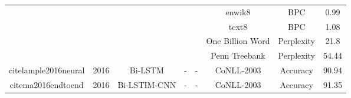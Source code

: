 \documentclass[12pt, a4paper, oneside]{report}
\begin{document}
\begin{tabular}{|c|c|c|c|c|c|cc|}
                                                                          &                       &                                   &                                         &                                                                                                        & enwik8                                & BPC                                                                                                                                & 0.99   \\ \cline{6-8} 
                                                                          &                       &                                   &                                         &                                                                                                        & text8                                 & BPC                                                                                                                                & 1.08   \\ \cline{6-8} 
                                                                          &                       &                                   &                                         &                                                                                                        & One Billion Word                      & Perplexity                                                                                                                         & 21.8   \\ \cline{6-8} 
                                                                          &                       &                                   &                                         &                                                                                                        & Penn Treebank                         & Perplexity                                                                                                                         & 54.44  \\ \hline
    cite{lample2016neural}                              & 2016                  & Bi-LSTM                           & -                                       & -                                                                                                      & CoNLL-2003                            & \multicolumn{1}{c|}{Accuracy}                                                                                                      & 90.94  \\ \hline
    cite{ma2016endtoend}                                & 2016                  & Bi-LSTIM-CNN                      & -                                       & -                                                                                                      & CoNLL-2003                            & \multicolumn{1}{c|}{Accuracy}                                                                                                      & 91.35  \\ \hline

\end{tabular}
\end{document}
